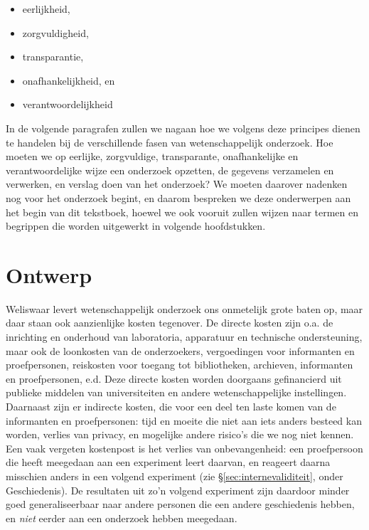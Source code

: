 \documentclass[
]{book}
\begin{document}
\begin{itemize}
\item
  eerlijkheid,
\item
  zorgvuldigheid,
\item
  transparantie,
\item
  onafhankelijkheid, en
\item
  verantwoordelijkheid
\end{itemize}

In de volgende paragrafen zullen we nagaan hoe we volgens deze principes
dienen te handelen bij de verschillende fasen van wetenschappelijk
onderzoek. Hoe moeten we op eerlijke, zorgvuldige, transparante,
onafhankelijke en verantwoordelijke wijze een onderzoek opzetten, de
gegevens verzamelen en verwerken, en verslag doen van het onderzoek? We
moeten daarover nadenken nog voor het onderzoek begint, en daarom
bespreken we deze onderwerpen aan het begin van dit tekstboek, hoewel we
ook vooruit zullen wijzen naar termen en begrippen die worden uitgewerkt
in volgende hoofdstukken.

\section{Ontwerp}\label{sec:ontwerp}

Weliswaar levert wetenschappelijk onderzoek ons onmetelijk grote baten
op, maar daar staan ook aanzienlijke kosten tegenover. De directe kosten
zijn o.a. de inrichting en onderhoud van laboratoria, apparatuur en
technische ondersteuning, maar ook de loonkosten van de onderzoekers,
vergoedingen voor informanten en proefpersonen, reiskosten voor toegang
tot bibliotheken, archieven, informanten en proefpersonen, e.d. Deze
directe kosten worden doorgaans gefinancierd uit publieke middelen van
universiteiten en andere wetenschappelijke instellingen. Daarnaast zijn
er indirecte kosten, die voor een deel ten laste komen van de
informanten en proefpersonen: tijd en moeite die niet aan iets anders
besteed kan worden, verlies van privacy, en mogelijke andere risico's
die we nog niet kennen. Een vaak vergeten kostenpost is het verlies van
onbevangenheid: een proefpersoon die heeft meegedaan aan een experiment
leert daarvan, en reageert daarna misschien anders in een volgend
experiment (zie
§\ref{sec:internevaliditeit}, onder Geschiedenis). De resultaten
uit zo'n volgend experiment zijn daardoor minder goed generaliseerbaar
naar andere personen die een andere geschiedenis hebben, en \emph{niet}
eerder aan een onderzoek hebben meegedaan.
\end{document}
